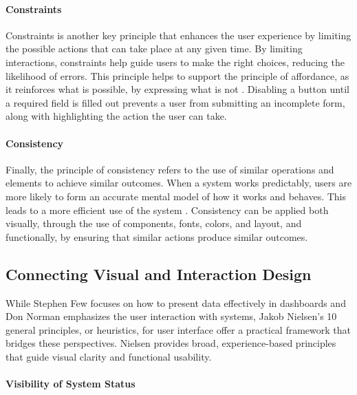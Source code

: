 \paragraph{Constraints}
\label{par:constraints}


Constraints is another key principle that enhances the user experience by limiting the possible actions that can take place at any given time. By limiting interactions, constraints help guide users to make the right choices, reducing the likelihood of errors. This principle helps to support the principle of affordance, as it reinforces what is possible, by expressing what is not \autocite[p. 28-29]{sharp-2019}. Disabling a button until a required field is filled out prevents a user from submitting an incomplete form, along with highlighting the action the user can take.

\paragraph{Consistency}
\label{par:consistency}


Finally, the principle of consistency refers to the use of similar operations and elements to achieve similar outcomes. When a system works predictably, users are more likely to form an accurate mental model of how it works and behaves. This leads to a more efficient use of the system \autocite[p. 29]{sharp-2019}. Consistency can be applied both visually, through the use of components, fonts, colors, and layout, and functionally, by ensuring that similar actions produce similar outcomes. 


\subsection{Connecting Visual and Interaction Design}
\label{subsubsec:connecting_visual_and_interaction_design}


While Stephen Few focuses on how to present data effectively in dashboards and Don Norman emphasizes the user interaction with systems, Jakob Nielsen's 10 general principles, or heuristics, for user interface offer a practical framework that bridges these perspectives.  Nielsen provides broad, experience-based principles that guide visual clarity and functional usability.

\paragraph{Visibility of System Status}
\label{par:visibility_system_status}


